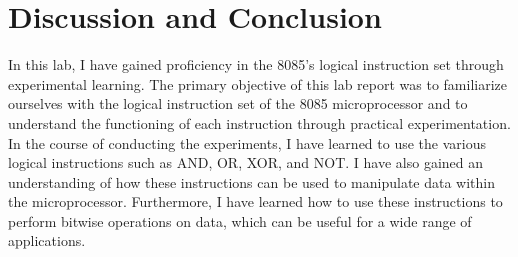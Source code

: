 \documentclass[]{report}
\begin{document}
\vspace{10mm}
\section*{Discussion and Conclusion}
In this lab, I have gained proficiency in the 8085's logical instruction set through experimental learning. The primary objective of this lab report was to familiarize ourselves with the logical instruction set of the 8085 microprocessor and to understand the functioning of each instruction through practical experimentation. In the course of conducting the experiments, I have learned to use the various logical instructions such as AND, OR, XOR, and NOT. I have also gained an understanding of how these instructions can be used to manipulate data within the microprocessor. Furthermore, I have learned how to use these instructions to perform bitwise operations on data, which can be useful for a wide range of applications.
\end{document}
